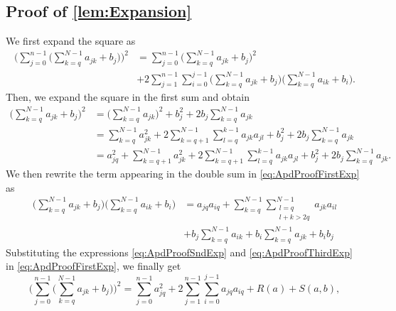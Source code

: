 \documentclass[10pt]{article}
\begin{document}
\subsection*{Proof of \cref{lem:Expansion}} 
We first expand the square as
	\begin{equation}\label{eq:ApdProofFirstExp}
	\begin{aligned}
		\Big(\sum_{j=0}^{n-1} \Big(\sum_{k=q}^{N-1} a_{jk} + b_j\Big)\Big)^2 &= \sum_{j=0}^{n-1} \Big(\sum_{k=q}^{N-1} a_{jk} + b_j\Big)^2 \\
		&+ 2 \sum_{j=1}^{n-1} \sum_{i=0}^{j-1}\Big(\sum_{k=q}^{N-1} a_{jk} + b_j\Big)\Big(\sum_{k=q}^{N-1} a_{ik} + b_i\Big).
	\end{aligned}
	\end{equation}
	Then, we expand the square in the first sum and obtain
	\begin{equation}\label{eq:ApdProofSndExp}
	\begin{aligned}
		\Big(\sum_{k=q}^{N-1} a_{jk} + b_j\Big)^2 &= \Big(\sum_{k=q}^{N-1} a_{jk}\Big)^2 + b_j^2 + 2 b_j \sum_{k=q}^{N-1} a_{jk}\\
		&= \sum_{k=q}^{N-1} a_{jk}^2 + 2\sum_{k=q+1}^{N-1}\sum_{l=q}^{k-1} a_{jk} a_{jl} + b_j^2 + 2 b_j \sum_{k=q}^{N-1} a_{jk}\\
		&= a_{jq}^2 + \sum_{k=q+1}^{N-1} a_{jk}^2 + 2\sum_{k=q+1}^{N-1}\sum_{l=q}^{k-1} a_{jk} a_{jl} + b_j^2 + 2 b_j \sum_{k=q}^{N-1} a_{jk}.
	\end{aligned}
	\end{equation}	
	We then rewrite the term appearing in the double sum in \eqref{eq:ApdProofFirstExp} as
	\begin{equation}\label{eq:ApdProofThirdExp}
	\begin{aligned}
		\Big(\sum_{k=q}^{N-1} a_{jk} + b_j\Big)\Big(\sum_{k=q}^{N-1} a_{ik} + b_i\Big) &= a_{jq}a_{iq} + \sum_{k=q}^{N-1}\sum_{\substack{l=q \\ l+k > 2q}}^{N-1} a_{jk}a_{il} \\
		&+ b_j \sum_{k=q}^{N-1} a_{ik} + b_i \sum_{k=q}^{N-1} a_{jk} + b_i b_j 
	\end{aligned}
	\end{equation}
	Substituting the expressions {\eqref{eq:ApdProofSndExp} and \eqref{eq:ApdProofThirdExp} in \eqref{eq:ApdProofFirstExp}}, we finally get 
	\begin{equation}
		\Big(\sum_{j=0}^{n-1} \Big(\sum_{k=q}^{N-1} a_{jk} + b_j\Big)\Big)^2 = \sum_{j=0}^{n-1} a_{jq}^2 + 2 \sum_{j=1}^{n-1} \sum_{i=0}^{j-1} a_{jq}a_{iq} + R(a) + S(a, b),
	\end{equation}
\end{document}
